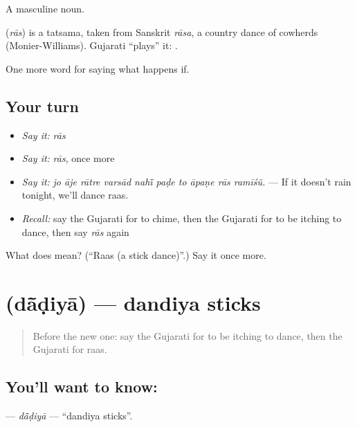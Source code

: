 A masculine noun.

\begin{cousinweb}
\textbf{} (\emph{rās}) is a tatsama, taken from Sanskrit \emph{rāsa}, a country dance of cowherds (Monier-Williams). Gujarati \textquotedblleft{}plays\textquotedblright{} it: \textbf{ }.
\end{cousinweb}

\begin{grammarlens}[title={What you've built}]
One more word for saying what happens if.
\end{grammarlens}

\subsection*{Your turn}
\begin{itemize}
\raggedright
  \item \emph{Say it:} \emph{rās}
  \item \emph{Say it:} \emph{rās}, once more
  \item \emph{Say it:} \emph{jo āje rātre varsād nahī̃ paḍe to āpaṇe rās ramīśũ.} — If it doesn't rain tonight, we'll dance raas.
  \item \emph{Recall:} say the Gujarati for to chime, then the Gujarati for to be itching to dance, then say \emph{rās} again
\end{itemize}

\begin{tcolorbox}[breakable,colback=teal!4,colframe=teal!35!black,title={Before you move on}]
What does  mean? (\textquotedblleft{}Raas (a stick dance)\textquotedblright{}.) Say it once more.
\end{tcolorbox}
\section[\texorpdfstring{\gu{દાંડિયા} (dā̃ḍiyā)}{દાંડિયા (dā̃ḍiyā)}]{ (dā̃ḍiyā) — dandiya sticks}

\label{lesson:GU-C554-dadiya}



\begin{quote}
Before the new one: say the Gujarati for to be itching to dance, then the Gujarati for raas.
\end{quote}

\subsection*{You'll want to know: }
\textbf{} — \emph{dā̃ḍiyā} — \textquotedblleft{}dandiya sticks\textquotedblright{}.

